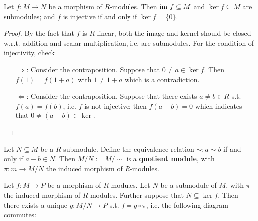 \documentclass{article}
\begin{document}
\begin{proposition}\label{prop:R-module morphism injective iff kernel is 0}
    Let $f: M\to N$ be a morphism of $R$-modules. Then $\mathrm{im}\  f\subseteq M$ and $\ker f \subseteq M$ are submodules; and $f$ is injective if and only if $\ker f = \{0\}$. 
\end{proposition}

\begin{proof}
    By the fact that $f$ is $R$-linear, both the image and kernel should be closed w.r.t. addition and scalar multiplication, i.e. are submodules. For the condition of injectivity, check
    \begin{itemize}
        \item[$\Rightarrow$:] Consider the contraposition. Suppose that $0 \neq a\in\ker f$. Then $f(1) = f(1 + a)$ with $1 \neq 1+a$ which is a contradiction.
        \item[$\Leftarrow$:] Consider the contraposition. Suppose that there exists $a \neq b \in R$ s.t. $f(a) = f(b)$, i.e. $f$ is not injective; then $f(a-b) = 0$ which indicates that $0 \neq (a - b)\in \ker $. 
    \end{itemize}
\end{proof}

\begin{definition}
    Let $N\subseteq M$ be a $R$-submodule. Define the equivalence relation $\sim: a\sim b$ if and only if $a - b \in N$. Then $M/N := M/\sim$ is a \textbf{quotient module}, with $\pi: m \to M/N$ the induced morphism of $R$-modules. 
\end{definition}

\begin{theorem}
    \label{thm:Universal Property of Quotient Modules}
    Let $f: M\to P$ be a morphism of $R$-modules. Let $N$ be a submodule of $M$, with $\pi$ the induced morphism of $R$-modules. Further suppose that $N \subseteq \ker f$. Then there exists a unique $g: M/N \to P$ s.t. $f = g\circ \pi$, i.e. the following diagram commutes:
    \begin{figure}[htbp]
        \centering
    \end{figure}
\end{theorem}
\end{document}
